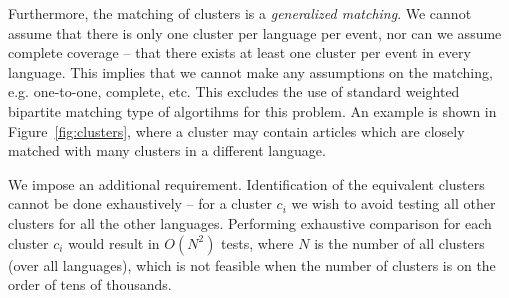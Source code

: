 \documentclass[twoside,11pt]{article}
\begin{document}
Furthermore, the matching of clusters is a \emph{generalized matching}. We cannot assume that there is only one cluster per language per event, nor can we assume complete coverage -- that there exists at least one cluster per event in every language. This implies that we cannot make any assumptions on the matching, e.g. one-to-one, complete, etc. This excludes the use of standard weighted bipartite matching type of algortihms for this problem. An example is shown in Figure~\ref{fig:clusters}, where a cluster may contain articles which are closely matched with many clusters in a different language.



We impose an additional requirement.  Identification of the equivalent clusters cannot be done exhaustively -- for a cluster $c_i$ we wish to avoid testing all other clusters for all the other languages. Performing exhaustive comparison for each cluster $c_i$ would result in $O(N^2)$ tests, where $N$ is the number of all clusters (over all languages), which is not feasible when the number of clusters is on the order of tens of thousands.
\end{document}
